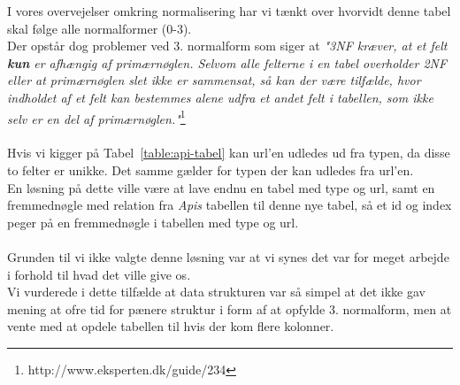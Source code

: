 I vores overvejelser omkring normalisering har vi tænkt over hvorvidt denne tabel skal følge alle normalformer (0-3).
\\
Der opstår dog problemer ved 3. normalform som siger at \textit{"3NF kræver, at et felt \textbf{kun} er afhængig af primærnøglen.
Selvom alle felterne i en tabel overholder 2NF eller at primærnøglen slet ikke er sammensat, så kan der være tilfælde, hvor indholdet af et felt kan bestemmes alene udfra et andet felt i tabellen, som ikke selv er en del af primærnøglen."}\footnote{http://www.eksperten.dk/guide/234}
\\\\
Hvis vi kigger på Tabel~\ref{table:api-tabel} kan url'en udledes ud fra typen, da disse to felter er unikke. Det samme gælder for typen der kan udledes fra url'en.
\\
En løsning på dette ville være at lave endnu en tabel med type og url, samt en fremmednøgle med relation fra \textit{Apis} tabellen til denne nye tabel, så et id og index peger på en fremmednøgle i tabellen med type og url.
\\\\
Grunden til vi ikke valgte denne løsning var at vi synes det var for meget arbejde i forhold til hvad det ville give os.
\\
Vi vurderede i dette tilfælde at data strukturen var så simpel at det ikke gav mening at ofre tid for pænere struktur i form af at opfylde 3. normalform, men at vente med at opdele tabellen til hvis der kom flere kolonner.

